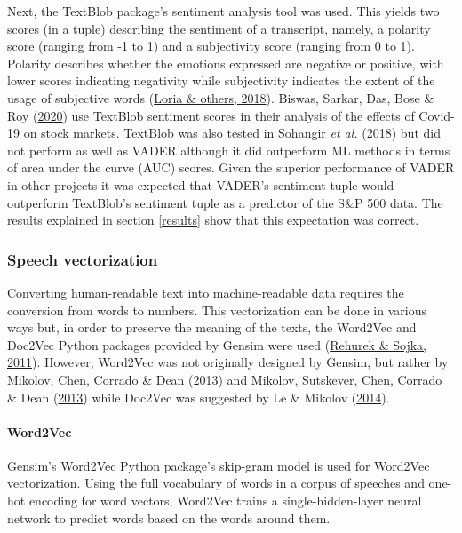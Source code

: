 \documentclass[11pt,preprint, authoryear]{elsarticle}
\numberwithin{equation}{section}
\numberwithin{figure}{section}
\numberwithin{table}{section}
\begin{document}
Next, the TextBlob package's sentiment analysis tool was used. This
yields two scores (in a tuple) describing the sentiment of a transcript,
namely, a polarity score (ranging from -1 to 1) and a subjectivity score
(ranging from 0 to 1). Polarity describes whether the emotions expressed
are negative or positive, with lower scores indicating negativity while
subjectivity indicates the extent of the usage of subjective words
(\protect\hyperlink{ref-loria2018textblob}{Loria \& others, 2018}).
Biswas, Sarkar, Das, Bose \& Roy
(\protect\hyperlink{ref-biswas2020examining}{2020}) use TextBlob
sentiment scores in their analysis of the effects of Covid-19 on stock
markets. TextBlob was also tested in Sohangir \emph{et al.}
(\protect\hyperlink{ref-sohangir2018financial}{2018}) but did not
perform as well as VADER although it did outperform ML methods in terms
of area under the curve (AUC) scores. Given the superior performance of
VADER in other projects it was expected that VADER's sentiment tuple
would outperform TextBlob's sentiment tuple as a predictor of the S\&P
500 data. The results explained in section \ref{results} show that this
expectation was correct.

\hypertarget{speech-vectorization}{%
\subsubsection{Speech vectorization}\label{speech-vectorization}}

Converting human-readable text into machine-readable data requires the
conversion from words to numbers. This vectorization can be done in
various ways but, in order to preserve the meaning of the texts, the
Word2Vec and Doc2Vec Python packages provided by Gensim were used
(\protect\hyperlink{ref-rehurek2011gensim}{Rehurek \& Sojka, 2011}).
However, Word2Vec was not originally designed by Gensim, but rather by
Mikolov, Chen, Corrado \& Dean
(\protect\hyperlink{ref-mikolov2013efficient}{2013}) and Mikolov,
Sutskever, Chen, Corrado \& Dean
(\protect\hyperlink{ref-mikolov2013distributed}{2013}) while Doc2Vec was
suggested by Le \& Mikolov
(\protect\hyperlink{ref-le2014distributed}{2014}).

\hypertarget{word2vec}{%
\paragraph{Word2Vec}\label{word2vec}}

Gensim's Word2Vec Python package's skip-gram model is used for Word2Vec
vectorization. Using the full vocabulary of words in a corpus of
speeches and one-hot encoding for word vectors, Word2Vec trains a
single-hidden-layer neural network to predict words based on the words
around them.
\end{document}
